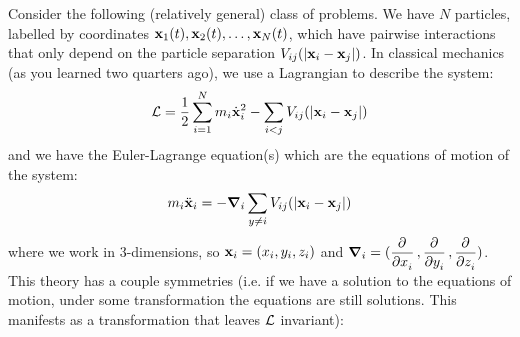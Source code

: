 Consider the following (relatively general) class of problems. We have $N$ particles, labelled by coordinates $\mathbf{x}_1(t), \mathbf{x}_2(t), \ldots, \mathbf{x}_N(t)$, which have pairwise interactions that only depend on the particle separation $V_{ij}(\lvert \mathbf{x}_i - \mathbf{x}_j \rvert)$. In classical mechanics (as you learned two quarters ago), we use a Lagrangian to describe the system:
\begin{equation}
    \mathcal{L} = \frac{1}{2}\sum_{i=1}^N m_i \dot{\mathbf{x}}^2_i - \sum_{i < j}V_{ij}(\lvert \mathbf{x}_i - \mathbf{x}_j \rvert)
\end{equation}
and we have the Euler-Lagrange equation(s) which are the equations of motion of the system:
\begin{equation}
    m_i\ddot{\v{x}}_i = -\nabla_i\sum_{y\neq i} V_{ij}(\abs{\v{x}_i - \v{x}_j})
\end{equation}
where we work in 3-dimensions, so $\mathbf{x}_i = (x_i, y_i, z_i)$ and $\nabla_i = (\dpd{}{x_i}, \dpd{}{y_i}, \dpd{}{z_i})$. This theory has a couple symmetries (i.e. if we have a solution to the equations of motion, under some transformation the equations are still solutions. This manifests as a transformation that leaves $\mathcal{L}$ invariant):
